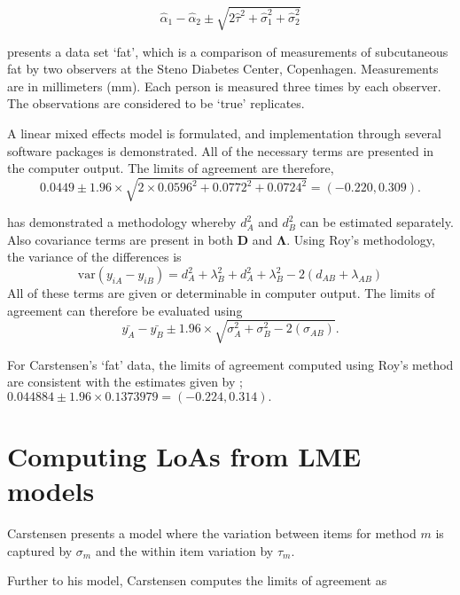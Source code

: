 \documentclass[12pt, a4paper]{report}
\theoremstyle{plain}
\theoremstyle{definition}
\theoremstyle{remark}
\begin{document}
\[
\hat{\alpha}_1 - \hat{\alpha}_2 \pm \sqrt{2 \hat{\tau}^2 +
	\hat{\sigma}^2_1 + \hat{\sigma}^2_2}
\]


\citet{BXC2008} presents a data set `fat', which is a comparison of measurements of subcutaneous fat
by two observers at the Steno Diabetes Center, Copenhagen. Measurements are in millimeters
(mm). Each person is measured three times by each observer. The observations are considered to be `true' replicates.

A linear mixed effects model is formulated, and implementation through several software packages is demonstrated.
All of the necessary terms are presented in the computer output. The limits of agreement are therefore,
\begin{equation}
0.0449  \pm 1.96 \times  \sqrt{2 \times 0.0596^2 + 0.0772^2 + 0.0724^2} = (-0.220,  0.309).
\end{equation}

\citet{Roy2009} has demonstrated a methodology whereby $d^2_{A}$ and $d^2_{B}$ can be estimated separately. Also covariance terms are present in both $\boldsymbol{D}$ and $\boldsymbol{\Lambda}$. Using Roy's methodology, the variance of the differences is
\begin{equation}
\mbox{var} (y_{iA}-y_{iB})= d^2_{A} + \lambda^2_{B} + d^2_{A} + \lambda^2_{B} - 2(d_{AB} + \lambda_{AB})
\end{equation}
All of these terms are given or determinable in computer output.
The limits of agreement can therefore be evaluated using
\begin{equation}
\bar{y_{A}}-\bar{y_{B}} \pm 1.96 \times \sqrt{ \sigma^2_{A} + \sigma^2_{B}  - 2(\sigma_{AB})}.
\end{equation}

For Carstensen's `fat' data, the limits of agreement computed using Roy's
method are consistent with the estimates given by \citet{BXC2008}; $0.044884  \pm 1.96 \times  0.1373979 = (-0.224,  0.314).$



\section{Computing LoAs from LME models}




Carstensen presents a model where the variation between items for
method $m$ is captured by $\sigma_m$ and the within item variation
by $\tau_m$.

Further to his model, Carstensen computes the limits of agreement
as
\end{document}
